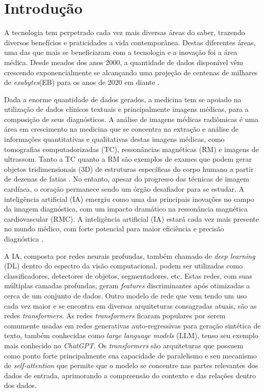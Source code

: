 \chapter{Introdução}
\label{chap:intro}

A tecnologia tem perpetrado cada vez mais diversas áreas do saber, trazendo diversos benefícios e praticidades a vida contemporânea. Destas diferentes áreas, uma das que mais se beneficiaram com a tecnologia e a inovação foi a área médica. Desde meados dos anos 2000, a quantidade de dados disponível vêm crescendo exponencialmente se alcançando uma projeção de centenas de milhares de \textit{exabytes}(EB) para os anos de 2020 em diante \cite{gantzDIGITALUNIVERSE2020}.

Dada a enorme quantidade de dados gerados, a medicina tem se apoiado na utilização de dados clínicos textuais e principalmente imagens médicas, para a composição de seus diagnósticos. A análise de imagens médicas radiômicas é uma área em crescimento na medicina que se concentra na extração e análise de informações quantitativas e qualitativas destas imagens médicas, como tomografias computadorizadas (TC), ressonâncias magnéticas (RM) e imagens de ultrassom. Tanto a TC quanto a RM são exemplos de exames que podem gerar objetos tridimensionais (3D) de estruturas específicas do corpo humano a partir de dezenas de fatias \cite{book:1355375}. No entanto, apesar do progresso das técnicas de imagem cardíaca, o coração permanece sendo um órgão desafiador para se estudar. A inteligência artificial (IA) emergiu como uma das principais inovações no campo da imagem diagnóstica, com um impacto dramático na ressonância magnética cardiovascular (RMC). A inteligência artificial (IA) estará cada vez mais presente no mundo médico, com forte potencial para maior eficiência e precisão diagnóstica \cite{argentieroApplicationsArtificialIntelligence2022}.

A IA, composta por redes neurais profundas, também chamado de \textit{deep learning} (DL) dentro do espectro da visão computacional, podem ser utilizadas como classificadores, detectores de objetos, segmentadores, etc. Estas redes, com suas múltiplas camadas profundas, geram \textit{features} discriminantes após otimizadas a cerca de um conjunto de dados. Outro modelo de rede que vem tendo um uso cada vez maior e se encontra em diversas arquiteturas consagradas atuais, são as redes \textit{transformers}. As redes \textit{transformers} ficaram populares por serem comumente usadas em redes generativas auto-regressivas para geração sintética de texto, também conhecidas como \textit{large language models} (LLM), tenso seu exemplo mais conhecido no \textit{ChatGPT}. Os \textit{transformers} são arquiteturas que possuem como ponto forte principalmente sua capacidade de paralelismo e seu mecanismo de \textit{self-attention} que permite que o modelo se concentre nas partes relevantes dos dados de entrada, aprimorando a compreensão do contexto e das relações dentro dos dados.

